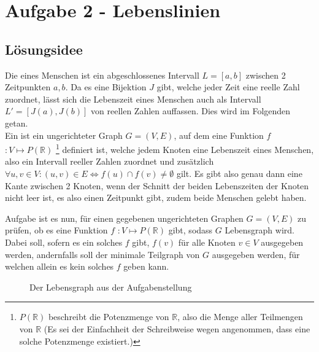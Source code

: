 \section{Aufgabe 2 - Lebenslinien}
\subsection{Lösungsidee}
Die  eines Menschen ist ein abgeschlossenes Intervall $L = [a,b]$ zwischen 2 Zeitpunkten $a, b$. Da es eine Bijektion $J$ gibt, welche jeder Zeit eine reelle Zahl zuordnet, lässt sich die Lebenszeit eines Menschen auch als Intervall $L' = [J(a),J(b)]$ von reellen Zahlen auffassen. Dies wird im Folgenden getan.\\
Ein  ist ein ungerichteter Graph $G = (V,E)$, auf dem eine Funktion $f$ \small{$ : V \mapsto P(\mathbb{R})$}
\footnote{$P(\mathbb{R})$ beschreibt die Potenzmenge von $\mathbb{R}$, also die Menge aller Teilmengen von $\mathbb{R}$ (Es sei der Einfachheit der Schreibweise wegen angenommen, dass eine solche Potenzmenge existiert.)} definiert ist, welche jedem Knoten eine Lebenszeit eines Menschen, also ein Intervall reeller Zahlen zuordnet und zusätzlich $\forall u,v \in V: (u,v) \in E \Leftrightarrow f(u) \cap f(v) \not= \emptyset $ gilt. Es gibt also genau dann eine Kante zwischen 2 Knoten, wenn der Schnitt der beiden Lebenszeiten der Knoten nicht leer ist, es also einen Zeitpunkt gibt, zudem beide Menschen gelebt haben.

Aufgabe ist es nun, für einen gegebenen ungerichteten Graphen $G = (V,E)$ zu prüfen, ob es eine Funktion $f$ \small{$ : V \mapsto P(\mathbb{R})$} gibt, sodass $G$ Lebensgraph wird.\\
Dabei soll, sofern es ein solches $f$ gibt, $f(v)$ für alle Knoten $v \in V$ ausgegeben werden, andernfalls soll der minimale Teilgraph von $G$ ausgegeben werden, für welchen allein es kein solches $f$ geben kann.

\begin{center}
\begin{figure}[h]
\caption{Der Lebensgraph aus der Aufgabenstellung}
\end{figure}
\end{center}

